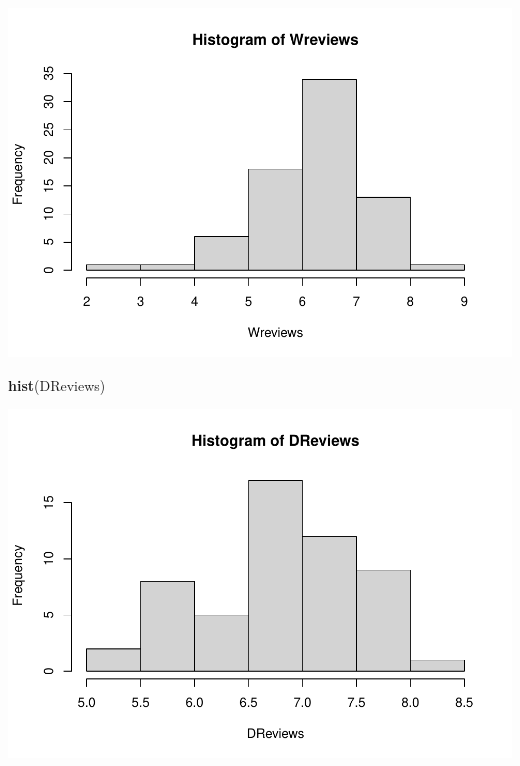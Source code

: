 \documentclass[]{article}
\newenvironment{Shaded}{\begin{snugshade}}{\end{snugshade}}
\newcommand{\KeywordTok}[1]{\textcolor[rgb]{0.13,0.29,0.53}{\textbf{#1}}}
\newcommand{\NormalTok}[1]{#1}
\newcommand{\OperatorTok}[1]{\textcolor[rgb]{0.81,0.36,0.00}{\textbf{#1}}}
\begin{document}
\includegraphics{Denzel-v-Will-data_files/figure-latex/unnamed-chunk-6-3.pdf}

\begin{Shaded}
\begin{Highlighting}[]
\KeywordTok{hist}\NormalTok{(DReviews)}
\end{Highlighting}
\end{Shaded}

\includegraphics{Denzel-v-Will-data_files/figure-latex/unnamed-chunk-6-4.pdf}

\begin{Shaded}
\end{Shaded}
\end{document}
